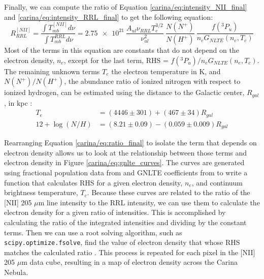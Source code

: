 Finally, we can compute the ratio of Equation \ref{carina/eq:intensity_NII_final} and \ref{carina/eq:intensity_RRL_final} to get the following equation:
\begin{equation}
    R^{[NII]}_{RRL} = \frac{\int{T^{[NII]}_{mb} d\nu}}{\int{T^{RRL}_{mb} d\nu}} = \num{2.75e21}\ \frac{A_{ul}\nu_{RRL}T_e^{3/2}}{\nu_{ul}^2}\ \frac{N(N^+)}{N(H^+)}\ \frac{f(^3P_u)}{n_e G_{NLTE}(n_e,T_c)}
    \label{carina/eq:ratio_final}
\end{equation}
Most of the terms in this equation are constants that do not depend on the electron density, $n_e$, except for the last term, RHS = $f(^3P_u)/n_e G_{NLTE}(n_e,T_c)$.
The remaining unknown terms $T_e$ the electron temperature in K, and $N(N^+)/N(H^+)$, the abundance ratio of ionized nitrogen with respect to ionized hydrogen, can be estimated using the distance to the Galactic center, $R_{gal}$, in kpc \citep{pineda2018, balser2015azimuthal, esteban2018revisiting}:
\begin{align}
    T_e &= (4446 \pm 301) + (467 \pm 34) R_{gal} \\
    12 + \log(N/H) &= (8.21 \pm 0.09) - (0.059 \pm 0.009) R_{gal}
\end{align}

Rearranging Equation \ref{carina/eq:ratio_final} to isolate the term that depends on electron density allows us to look at the relationship between those terms and electron density in Figure \ref{carina/eq:gnlte_curves}.
The curves are generated using fractional population data from \cite{luridiana2015pyneb} and GNLTE coefficients from \cite{gordon2002radio} to write a function that calculates RHS for a given electron density, $n_e$, and continuum brightness temperature, $T_c$.
Because these curves are related to the ratio of the [NII] 205 $\mu$m line intensity to the RRL intensity, we can use them to calculate the electron density for a given ratio of intensities.
This is accomplished by calculating the ratio of the integrated intensities and dividing by the constant terms. 
Then we can use a root solving algorithm, such as \texttt{scipy.optimize.fsolve}, find the value of electron density that whose RHS matches the calculated ratio \cite{2020SciPy-NMeth}.
This process is repeated for each pixel in the [NII] 205 $\mu$m data cube, resulting in a map of electron density across the Carina Nebula.

